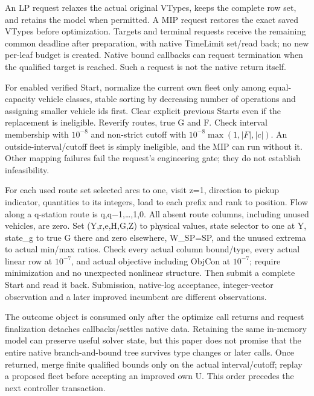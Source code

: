 \documentclass[
  american,
  11pt,
]{article}
\begin{document}
An LP request relaxes the actual original VTypes, keeps the complete row
set, and retains the model when permitted. A MIP request restores the
exact saved VTypes before optimization. Targets and terminal requests
receive the remaining common deadline after preparation, with native
TimeLimit set/read back; no new per-leaf budget is created. Native bound
callbacks can request termination when the qualified target is reached.
Such a request is not the native return itself.

For enabled verified Start, normalize the current own fleet only among
equal-capacity vehicle classes, stable sorting by decreasing number of
operations and assigning smaller vehicle ids first. Clear explicit
previous Starts even if the replacement is ineligible. Reverify routes,
true G and F. Check interval membership with \(10^{-8}\) and non-strict
cutoff with \(10^{-8}\max(1,|F|,|c|)\). An outside-interval/cutoff fleet
is simply ineligible, and the MIP can run without it. Other mapping
failures fail the request's engineering gate; they do not establish
infeasibility.

For each used route set selected arcs to one, visit z=1, direction to
pickup indicator, quantities to its integers, load to each prefix and
rank to position. Flow along a q-station route is q,q−1,\ldots,1,0. All
absent route columns, including unused vehicles, are zero. Set
(Y,r,e,H,G,Z) to physical values, state selector to one at Y, state\_\allowbreak{}g
to true G there and zero elsewhere, W\_\allowbreak{}SP=SP, and the unused extrema to
actual min/max ratios. Check every actual column bound/type, every
actual linear row at \(10^{-7}\), and actual objective including ObjCon
at \(10^{-7}\); require minimization and no unexpected nonlinear
structure. Then submit a complete Start and read it back. Submission,
native-log acceptance, integer-vector observation and a later improved
incumbent are different observations.

The outcome object is consumed only after the optimize call returns and
request finalization detaches callbacks/settles native data. Retaining
the same in-memory model can preserve useful solver state, but this
paper does not promise that the entire native branch-and-bound tree
survives type changes or later calls. Once returned, merge finite
qualified bounds only on the actual interval/cutoff; replay a proposed
fleet before accepting an improved own U. This order precedes the next
controller transaction.
\end{document}
